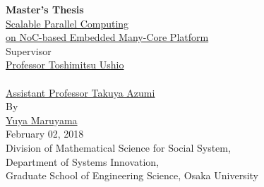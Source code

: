 \documentclass[a4j,12pt,oneside,openany,english]{jsbook}
\date{\today}
\begin{document}
\renewcommand{\headfont}{\bfseries}


\thispagestyle{empty}
\begin{center}
  \vspace*{5mm}
  {\Huge {\bf Master's Thesis}}\\
  \vspace{2cm}
  \vspace{1cm}
  \underline{\LARGE{Scalable Parallel Computing}} \\
  \vspace{0.2cm}
  \underline{\LARGE{on NoC-based Embedded Many-Core Platform}} \\  
  \vspace{0.5cm}
  \vspace{12mm}
  {\large Supervisor}\\
  \vspace{6mm}
  \underline{\Large Professor Toshimitsu Ushio}\\
  　\\
  \underline{\Large Assistant Professor Takuya Azumi}\\
  \vspace{8mm}
  {\large By}\\
  \vspace{6mm}
  \underline{\Large Yuya Maruyama}\\
  \vspace{10mm}
  {\Large February 02, 2018}\\  
  \vspace{14mm}
  {\Large Division of Mathematical Science for Social System,}\\
  {\Large Department of Systems Innovation,}\\
  {\Large Graduate School of Engineering Science, Osaka University}\\
\end{center}
\clearpage
\setcounter{page}{0}
\end{document}
